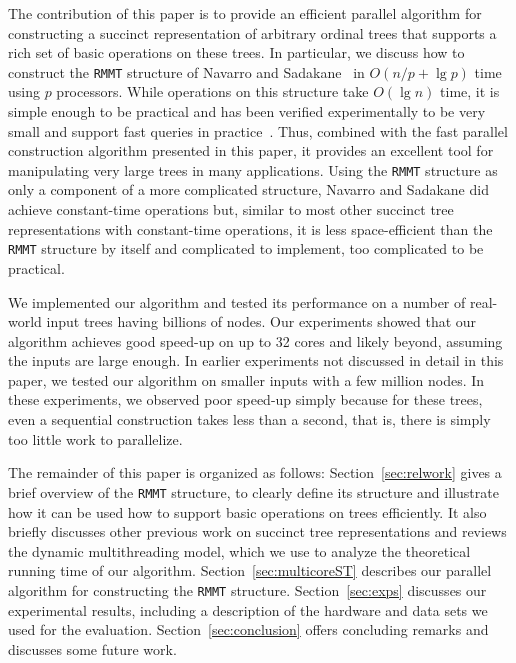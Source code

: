 The contribution of this paper is to provide an efficient parallel algorithm
for constructing a succinct representation of arbitrary ordinal trees that
supports a rich set of basic operations on these trees.
In particular, we discuss how to construct the {\tt RMMT} structure of
Navarro and Sadakane~\cite{Navarro:2014:FFS:2620785.2601073} in
$O(n/p + \lg p)$ time using $p$ processors.
While operations on this structure take $O(\lg n)$ time, it is simple enough
to be practical and has been verified experimentally to be very small and
support fast queries in practice~\cite{ACNSalenex10}.
Thus, combined with the fast parallel construction algorithm presented in this
paper, it provides an excellent tool for manipulating very large trees in
many applications.
Using the {\tt RMMT} structure as only a component of a more complicated
structure, Navarro and Sadakane did achieve constant-time operations but,
similar to most other succinct tree representations with constant-time
operations, it is less space-efficient than the {\tt RMMT} structure by itself
and complicated to implement, too complicated to be practical.

We implemented our algorithm and tested its performance on a number of
real-world input trees having billions of nodes.
Our experiments showed that our algorithm achieves good speed-up on up to
32 cores and likely beyond, assuming the inputs are large enough.
In earlier experiments not discussed in detail in this paper, we tested our
algorithm on smaller inputs with a few million nodes.
In these experiments, we observed poor speed-up simply because for these
trees, even a sequential construction takes less than a second, that is, there
is simply too little work to parallelize.

The remainder of this paper is organized as follows:
Section~\ref{sec:relwork} gives a brief overview of the {\tt RMMT} structure,
to clearly define its structure and illustrate how it can be used how to support
basic operations on trees efficiently.
It also briefly discusses other previous work on succinct tree representations
and reviews the dynamic multithreading model, which we use to analyze the
theoretical running time of our algorithm.
Section~\ref{sec:multicoreST} describes our parallel algorithm for constructing
the {\tt RMMT} structure.
Section~\ref{sec:exps} discusses our experimental results, including a
description of the hardware and data sets we used for the evaluation.
Section~\ref{sec:conclusion} offers concluding remarks and discusses some
future work.
